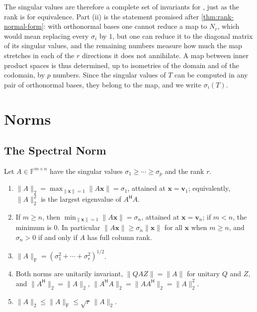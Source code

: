 The singular values are therefore a complete set of invariants for , just as the rank is for equivalence. Part (ii) is the statement promised after \cref{thm:rank-normal-form}: with orthonormal bases one cannot reduce a map to $N_r$, which would mean replacing every $\sigma_i$ by $1$, but one can reduce it to the diagonal matrix of its singular values, and the remaining numbers measure how much the map stretches in each of the $r$ directions it does not annihilate. A map between inner product spaces is thus determined, up to isometries of the domain and of the codomain, by $p$ numbers. Since the singular values of $T$ can be computed in any pair of orthonormal bases, they belong to the map, and we write $\sigma_i(T)$.

\section{Norms}
\label{sec:svd-norms}

\subsection{The Spectral Norm}

\begin{theorem}
\label{thm:two-norm}
Let $A\in\mathbb F^{m\times n}$ have the singular values $\sigma_1\ge\cdots\ge\sigma_p$ and the rank $r$.
\begin{enumerate}
\item $\|A\|_2=\max_{\|\mathbf x\|=1}\|A\mathbf x\|=\sigma_1$, attained at $\mathbf x=\mathbf v_1$; equivalently, $\|A\|_2^2$ is the largest eigenvalue of $A^{\mathsf H}A$.
\item If $m\ge n$, then $\min_{\|\mathbf x\|=1}\|A\mathbf x\|=\sigma_n$, attained at $\mathbf x=\mathbf v_n$; if $m<n$, the minimum is $0$. In particular $\|A\mathbf x\|\ge\sigma_n\|\mathbf x\|$ for all $\mathbf x$ when $m\ge n$, and $\sigma_n>0$ if and only if $A$ has full column rank.
\item $\|A\|_{\mathrm F}=(\sigma_1^2+\cdots+\sigma_r^2)^{1/2}$.
\item Both norms are unitarily invariant, $\|QAZ\|=\|A\|$ for unitary $Q$ and $Z$, and $\|A^{\mathsf H}\|_2=\|A\|_2$, $\|A^{\mathsf H}A\|_2=\|AA^{\mathsf H}\|_2=\|A\|_2^2$.
\item $\|A\|_2\le\|A\|_{\mathrm F}\le\sqrt r\,\|A\|_2$.
\end{enumerate}
\end{theorem}

